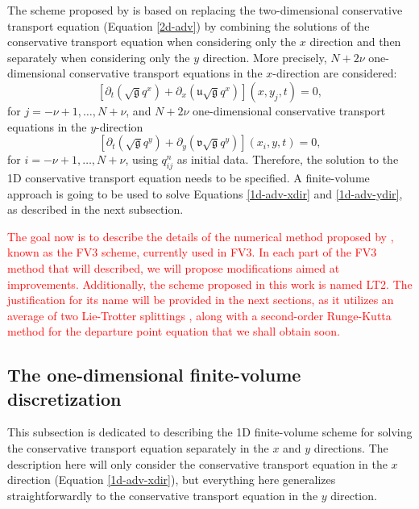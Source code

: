 \documentclass[preprint,12pt]{elsarticle}
\begin{document}
\begin{linenumbers}
The scheme proposed by \cite{lin:1996} is based on replacing the two-dimensional conservative transport equation (Equation \eqref{2d-adv}) by combining the solutions of the conservative transport equation when considering only the $x$ direction and then separately when considering only the $y$ direction.
More precisely, $N+2\nu$ one-dimensional conservative transport equations in the $x$-direction are considered:
\begin{equation}
	\label{1d-adv-xdir}
	[{\partial_t (\sqrt{\mathfrak{g}}q^x)}+{\partial_x (\mathfrak{u}\sqrt{\mathfrak{g}}q^x)}](x, y_j, t) = 0,
\end{equation}
for $j=-\nu+1, \ldots, N + \nu$, and
$N+2\nu$ one-dimensional conservative transport equations in the $y$-direction
\begin{equation}
	\label{1d-adv-ydir}
	[{\partial_t (\sqrt{\mathfrak{g}}q^y)} +{\partial_y (\mathfrak{v}\sqrt{\mathfrak{g}}q^y)}](x_i, y, t) = 0,
\end{equation}
for $i=-\nu+1, \ldots, N + \nu$, using $q_{ij}^n$ as initial data.
Therefore, the solution to the 1D conservative transport equation needs to be specified.
A finite-volume approach is going to be used to solve Equations \eqref{1d-adv-xdir} and \eqref{1d-adv-ydir}, as described in the next subsection.

\textcolor{red}
{
The goal now is to describe the details of the numerical method proposed by \citep{putman:2007}, known as the FV3 scheme, currently used in FV3.
In each part of the FV3 method that will described, we will propose modifications aimed at improvements. 
Additionally, the scheme proposed in this work is named LT2.
The justification for its name will be provided in the next sections, as it utilizes an average of two Lie-Trotter splittings \cite{holden:2010}, along with a second-order Runge-Kutta method for the departure point equation that we shall obtain soon.
}

\subsection{The one-dimensional finite-volume discretization}
\label{1d-adv}
This subsection is dedicated to describing the 1D finite-volume scheme for solving the conservative transport equation separately in the $x$ and $y$ directions.
The description here will only consider the conservative transport equation in the $x$ direction (Equation \ref{1d-adv-xdir}), but everything here generalizes straightforwardly to the conservative transport equation in the $y$ direction.


\end{linenumbers}
\end{document}
